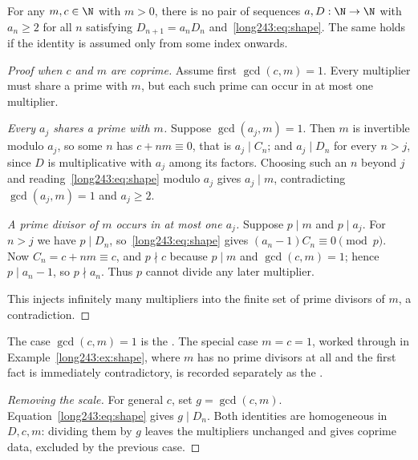 \begin{theorem}\label{long243:res:constant}
For any $m,c\in\N$ with $m>0$, there is no pair of sequences
$a,D:\N\to\N$ with $a_n\ge2$ for all $n$ satisfying
$D_{n+1}=a_nD_n$ and~\eqref{long243:eq:shape}. The same holds if the
identity is assumed only from some index onwards.
\end{theorem}

\begin{proof}[Proof when $c$ and $m$ are coprime]
Assume first $\gcd(c,m)=1$. Every multiplier must share a prime with
$m$, but each such prime can occur in at most one multiplier.

\emph{Every $a_j$ shares a prime with $m$.}  Suppose $\gcd(a_j,m)=1$.  Then
$m$ is invertible modulo $a_j$, so some $n$ has $c+nm\equiv0$, that is
$a_j\mid C_n$; and $a_j\mid D_n$ for every $n>j$, since $D$ is multiplicative
with $a_j$ among its factors.  Choosing such an $n$ beyond $j$
and reading~\eqref{long243:eq:shape} modulo $a_j$ gives $a_j\mid m$, contradicting
$\gcd(a_j,m)=1$ and $a_j\ge2$.

\emph{A prime divisor of $m$ occurs in at most one $a_j$.}  Suppose $p\mid m$
and $p\mid a_j$.  For $n>j$ we have $p\mid D_n$, so~\eqref{long243:eq:shape} gives
$(a_n-1)C_n\equiv0 \pmod p$.  Now $C_n=c+nm\equiv c$, and $p\nmid c$ because
$p\mid m$ and $\gcd(c,m)=1$; hence $p\mid a_n-1$, so $p\nmid a_n$.  Thus $p$
cannot divide any later multiplier.

This injects infinitely many multipliers into the finite set of prime
divisors of $m$, a contradiction.
\end{proof}

\noindent The case $\gcd(c,m)=1$ is the
.  The special case $m=c=1$, worked through in
Example~\ref{long243:ex:shape}, where $m$ has no prime divisors at all and the first
fact is immediately contradictory, is recorded separately as the
.

\begin{proof}[Removing the scale]
For general $c$, set $g=\gcd(c,m)$. Equation~\eqref{long243:eq:shape}
gives $g\mid D_n$. Both identities are homogeneous in $D,c,m$:
dividing them by $g$ leaves the multipliers unchanged and gives
coprime data, excluded by the previous case.
\end{proof}

